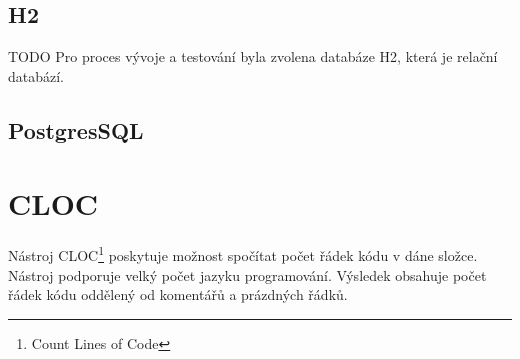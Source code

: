     \subsection{H2}
        TODO Pro proces vývoje a testování byla zvolena databáze H2\cite{h2-db}, která je relační databází. 
    \subsection{PostgresSQL}
        

\section{CLOC}\label{reserse:cloc}
    Nástroj CLOC\footnote{Count Lines of Code}\cite{cloc-download} poskytuje možnost spočítat počet řádek kódu v dáne složce. Nástroj podporuje velký počet jazyku programování. Výsledek obsahuje počet řádek kódu oddělený od komentářů a prázdných řádků.